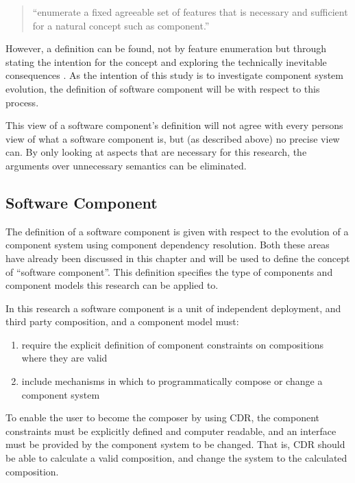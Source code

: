 \begin{quotation} 
``enumerate a fixed agreeable set of features that is necessary and sufficient for a natural concept such as component.'' 
\end{quotation}

However, a definition can be found, not by feature enumeration but through stating the intention for the concept and exploring the technically inevitable consequences \citep{Szyperski2002}. 
As the intention of this study is to investigate component system evolution,
the definition of software component will be with respect to this process.

This view of a software component's definition will not agree with every persons view of what a software component is, but (as described above) no precise view can.
By only looking at aspects that are necessary for this research, the arguments over unnecessary semantics can be eliminated. 

\subsection{Software Component}
The definition of a software component is given with respect to the evolution of a component system using component dependency resolution.
Both these areas have already been discussed in this chapter and will be used to define the concept of ``software component''.
This definition specifies the type of components and component models this research can be applied to.

In this research a software component is a unit of independent deployment, and third party composition,
and a component model must:
\begin{enumerate}
  \item require the explicit definition of component constraints on compositions where they are valid 
  \item include mechanisms in which to programmatically compose or change a component system
\end{enumerate}

To enable the user to become the composer by using CDR, the component constraints must be explicitly defined and computer readable,
and an interface must be provided by the component system to be changed. 
That is, CDR should be able to calculate a valid composition, and change the system to the calculated composition.

